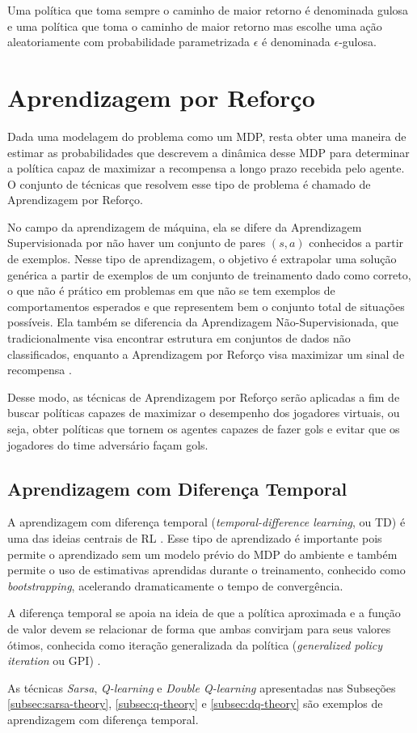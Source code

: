 Uma política que toma sempre o caminho de maior retorno é denominada gulosa e uma política que toma o caminho de maior retorno mas escolhe uma ação aleatoriamente com probabilidade parametrizada $\epsilon$ é denominada $\epsilon$-gulosa.


\section{Aprendizagem por Reforço}

Dada uma modelagem do problema como um MDP, resta obter uma maneira de estimar as probabilidades que descrevem a dinâmica desse MDP para determinar a política capaz de maximizar a recompensa a longo prazo recebida pelo agente. O conjunto de técnicas que resolvem esse tipo de problema é chamado de Aprendizagem por Reforço.

No campo da aprendizagem de máquina, ela se difere da Aprendizagem Supervisionada por não haver um conjunto de pares $(s, a)$ conhecidos a partir de exemplos.
Nesse tipo de aprendizagem, o objetivo é extrapolar uma solução genérica a partir de exemplos de um conjunto de treinamento dado como correto, o que não é prático em problemas em que não se tem exemplos de comportamentos esperados e que representem bem o conjunto total de situações possíveis.
Ela também se diferencia da Aprendizagem Não-Supervisionada, que tradicionalmente visa encontrar estrutura em conjuntos de dados não classificados, enquanto a Aprendizagem por Reforço visa maximizar um sinal de recompensa \cite{sutton2018reinforcement}.

Desse modo, as técnicas de Aprendizagem por Reforço serão aplicadas a fim de buscar políticas capazes de maximizar o desempenho dos jogadores virtuais, ou seja, obter políticas que tornem os agentes capazes de fazer gols e evitar que os jogadores do time adversário façam gols.

\subsection{Aprendizagem com Diferença Temporal}
\par A aprendizagem com diferença temporal (\textit{temporal-difference learning}, ou TD) é uma das ideias centrais de RL \cite{sutton2018reinforcement}. Esse tipo de aprendizado é importante pois permite o aprendizado sem um modelo prévio do MDP do ambiente e também permite o uso de estimativas aprendidas durante o treinamento, conhecido como \textit{bootstrapping}, acelerando dramaticamente o tempo de convergência. 
\par A diferença temporal se apoia na ideia de que a política aproximada e a função de valor devem se relacionar de forma que ambas convirjam para seus valores ótimos, conhecida como iteração generalizada da política (\textit{generalized policy iteration} ou GPI) \cite{sutton2018reinforcement}. 
\par As técnicas \textit{Sarsa}, \textit{Q-learning} e \textit{Double Q-learning} apresentadas nas Subseções \ref{subsec:sarsa-theory}, \ref{subsec:q-theory} e \ref{subsec:dq-theory} são exemplos de aprendizagem com diferença temporal.

